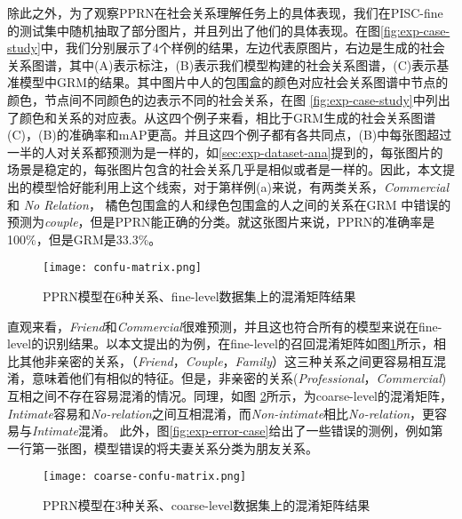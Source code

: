 除此之外，为了观察PPRN在社会关系理解任务上的具体表现，我们在PISC-fine的测试集中随机抽取了部分图片，并且列出了他们的具体表现。在图\ref{fig:exp-case-study}中，我们分别展示了4个样例的结果，左边代表原图片，右边是生成的社会关系图谱，其中(A)表示标注，(B)表示我们模型构建的社会关系图谱，(C)表示基准模型中GRM的结果。其中图片中人的包围盒的颜色对应社会关系图谱中节点的颜色，节点间不同颜色的边表示不同的社会关系，在图
\ref{fig:exp-case-study}中列出了颜色和关系的对应表。从这四个例子来看，相比于GRM生成的社会关系图谱(C)，(B)的准确率和mAP更高。并且这四个例子都有各共同点，(B)中每张图超过一半的人对关系都预测为是一样的，如\ref{sec:exp-dataset-ana}提到的，每张图片的场景是稳定的，每张图片包含的社会关系几乎是相似或者是一样的。因此，本文提出的模型恰好能利用上这个线索，对于第样例(a)来说，有两类关系，{\it Commercial}和
{\it No Relation}， 橘色包围盒的人和绿色包围盒的人之间的关系在GRM 中错误的预测为{\it couple}，但是PPRN能正确的分类。就这张图片来说，PPRN的准确率是100\%，但是GRM是33.3\%。
\begin{figure}[htpb]
	\centering
	\texttt{[image: confu-matrix.png]}
    \caption{PPRN模型在6种关系、fine-level数据集上的混淆矩阵结果}
	\vspace*{-3.5mm}
	\label{fig:exp-confu-fine}
\end{figure}

直观来看，{\it Friend}和{\it Commercial}很难预测，并且这也符合所有的模型来说在fine-level的识别结果。以本文提出的为例，在fine-level的召回混淆矩阵如图\ref{fig:exp-confu-fine}所示，相比其他非亲密的关系，（{\it Friend}，{\it Couple}，{\it Family}）这三种关系之间更容易相互混淆，意味着他们有相似的特征。但是，非亲密的关系({\it Professional}，{\it Commercial})互相之间不存在容易混淆的情况。同理，如图
\ref{fig:exp-confu-coarse}所示，为coarse-level的混淆矩阵，{\it Intimate}容易和{\it No-relation}之间互相混淆，而{\it Non-intimate}相比{\it No-relation}，更容易与{\it Intimate}混淆。
此外，图\ref{fig:exp-error-case}给出了一些错误的测例，例如第一行第一张图，模型错误的将夫妻关系分类为朋友关系。
\begin{figure}[htpb]
	\centering
	\texttt{[image: coarse-confu-matrix.png]}
    \caption{PPRN模型在3种关系、coarse-level数据集上的混淆矩阵结果}
	\vspace*{-3.5mm}
	\label{fig:exp-confu-coarse}
\end{figure}

